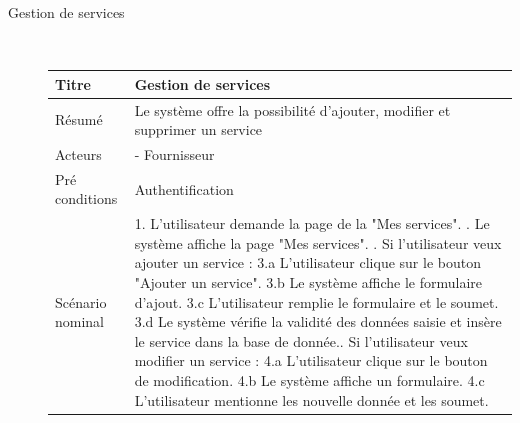\documentclass[french]{report}
\begin{document}
\begin{description}
    \newpage
        \item[Gestion de services] \hfill \newline \\
        \begin{minipage}{\linewidth}
        \centering
            \def\arraystretch{2}
            \begin{tabular}{|m{3cm}|m{9cm}|}
            \hline
            Titre                & Gestion de services                                                                                                 \\ 
            \hline
            Résumé               & Le système offre la possibilité d'ajouter, modifier et supprimer un service \\ 
            \hline
            Acteurs              & - Fournisseur                                                                                    \\ 
            \hline
            Pré conditions       & Authentification                                                                                                      \\ 
            \hline
            Scénario nominal     &  
                1. L'utilisateur demande la page de la "Mes services". \newline
                2. Le système affiche la page "Mes services". \newline
                3. Si l'utilisateur veux ajouter un service :\newline
                    3.a L'utilisateur clique sur le bouton "Ajouter un service". \newline
                    3.b Le système affiche le formulaire d'ajout. \newline
                    3.c L'utilisateur remplie le formulaire et le soumet. \newline
                    3.d Le système vérifie la validité des données saisie et insère le service dans la base de donnée.\newline
                4. Si l'utilisateur veux modifier un service : \newline
                    4.a L'utilisateur clique sur le bouton de modification. \newline
                    4.b Le système affiche un formulaire. \newline
                    4.c L'utilisateur mentionne les nouvelle donnée et les soumet.\newline

\end{tabular}
\end{minipage}
\end{description}
\end{document}

